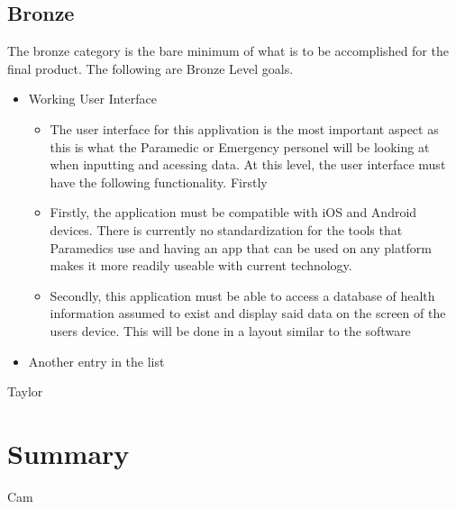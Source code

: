 \documentclass{article}
\begin{document}
\subsection{Bronze}
The bronze category is the bare minimum of what is to be accomplished for the final product. The following are Bronze Level goals. 
\begin{itemize}
  \item Working User Interface
	\begin{itemize}
	\item The user interface for this applivation is the most important aspect as this is what the Paramedic or Emergency personel will be looking at when inputting and acessing data. At this level, the user interface must have the following functionality. Firstly
	\item Firstly, the application must be compatible with iOS and Android devices. There is currently no standardization for the tools that Paramedics use and having an app that can be used on any platform makes it more readily useable with current technology.
	\item Secondly, this application must be able to access a database of health information assumed to exist and display said data on the screen of the users device. This will be done in a layout similar to the software 
	\end{itemize}
  \item Another entry in the list
\end{itemize}
Taylor
\section{Summary}
Cam
\end{document}
